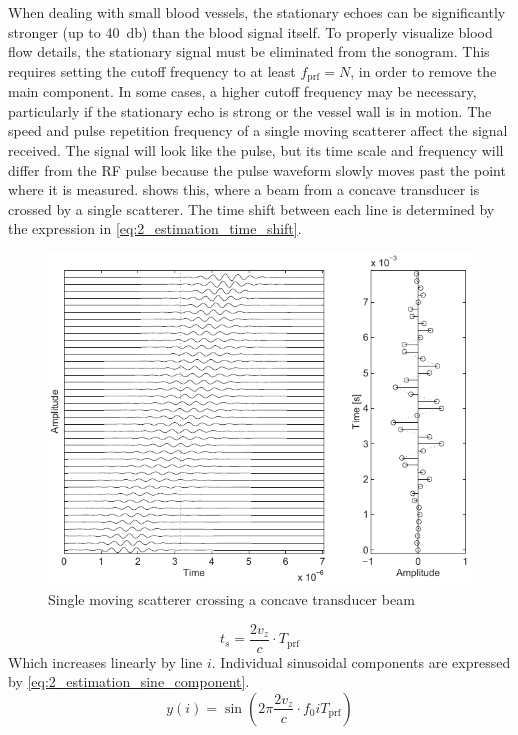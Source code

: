 When dealing with small blood vessels, the stationary echoes can be significantly stronger (up to \qty{40}{\decibel}) than the blood signal itself. To properly visualize blood flow details, the stationary signal must be eliminated from the sonogram. This requires setting the cutoff frequency to at least $f_{\mathrm{prf}} = N$, in order to remove the main component. In some cases, a higher cutoff frequency may be necessary, particularly if the stationary echo is strong or the vessel wall is in motion. The speed and pulse repetition frequency of a single moving scatterer affect the signal received. The signal will look like the pulse, but its time scale and frequency will differ from the RF pulse because the pulse waveform slowly moves past the point where it is measured.  shows this, where a beam from a concave transducer is crossed by a single scatterer. The time shift between each line is determined by the expression in \cref{eq:2_estimation_time_shift}.
\begin{figure}[htbp]
	\centering
	\includegraphics[width=.8\textwidth]{Figures/2_estimation_single_scatterer.pdf}
	\caption[Single moving scatterer crossing a concave transducer beam]{Single moving scatterer crossing a concave transducer beam \cite{JensenUltrasoundBook}}
	\label{fig:2_estimation_single_scatterer}
\end{figure}
\begin{equation} \label{eq:2_estimation_time_shift}
	t_{s} = \frac{2v_{z}}{c} \cdot T_{\mathrm{prf}}
\end{equation}
Which increases linearly by line $i$. Individual sinusoidal components are expressed by \cref{eq:2_estimation_sine_component}.
\begin{equation} \label{eq:2_estimation_sine_component}
	y(i) = \sin \left( 2\pi \frac{2v_{z}}{c}\cdot f_{0} iT_{\mathrm{prf}} \right)
\end{equation}

